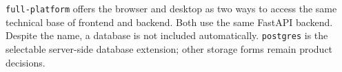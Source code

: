 \begin{beginnerstatement}

\texttt{full-platform} offers the browser and desktop as two ways to access
the same technical base of frontend and backend. Both use the same FastAPI
backend. Despite the name, a database is not included automatically.
\texttt{postgres} is the selectable server-side database extension; other
storage forms remain product decisions.

\end{beginnerstatement}
